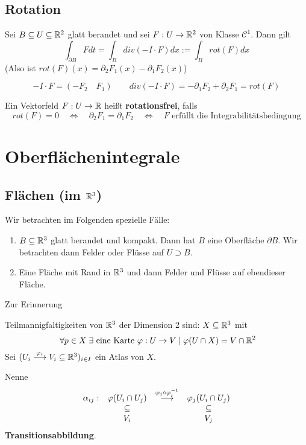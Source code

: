 \documentclass[main.tex]{subfiles}
\begin{document}
\subsection{Rotation}

\begin{Theorem}
  Sei $B \subseteq U \subseteq \mathbb{R}^2$ glatt berandet und sei $F : U \to \mathbb{R}^2$ von Klasse $\mathcal{C}^1$. Dann gilt
  $$\int_{\partial B} F dt = \int_B div(-I\cdot F)dx := \int_B rot(F) dx$$
  (Also ist $rot(F)(x) = \partial_2 F_1(x) - \partial_1 F_2(x)$)
\end{Theorem}

\begin{Beweis}
  $$-I \cdot F = (-F_2 \quad F_1) \qquad div(-I \cdot F) = -\partial_1 F_2 + \partial_2 F_1 = rot(F)$$
\end{Beweis}

\begin{Definition}
  Ein Vektorfeld $F: U \to \mathbb{R}$ heißt \textbf{rotationsfrei}, falls
  $$rot(F) = 0 \quad \Leftrightarrow \quad \partial_2 F_1 = \partial_1 F_2 \quad \Leftrightarrow \quad F \text{ erfüllt die Integrabilitätsbedingung}$$
\end{Definition}


\section{Oberflächenintegrale}

\subsection{Flächen (im $\mathbb{R}^3$)}

Wir betrachten im Folgenden spezielle Fälle:
\begin{enumerate}
  \item $B \subseteq \mathbb{R}^3$ glatt berandet und kompakt. Dann hat $B$ eine Oberfläche $\partial B$. Wir betrachten dann Felder oder Flüsse auf $U \supset B$.
  \item Eine Fläche mit Rand in $\mathbb{R}^3$ und dann Felder und Flüsse auf ebendieser Fläche.
\end{enumerate}

Zur Erinnerung
\begin{Definition}[Teilmannigfaltigkeit]
  Teilmannigfaltigkeiten von $\mathbb{R}^3$ der Dimension 2 sind: $X \subseteq \mathbb{R}^3$ mit
  $$\;\forall p \in X \;\exists \text{ eine Karte } \varphi: U \to V \mid \varphi(U \cap X) = V \cap \mathbb{R}^2$$
  Sei $(U_i \stackrel{\varphi_i}{\longrightarrow} V_i \subseteq \mathbb{R}^3)_{i \in I}$ ein Atlas von $X$.

  Nenne
  $$\begin{array}{c c c c}
    \alpha_{ij}: & \varphi(U_i \cap U_j) & \stackrel{\varphi_j \circ \varphi_i^{-1}}{\longrightarrow} & \varphi_j(U_i \cap U_j) \\
    & \subseteq & & \subseteq \\
    & V_i & & V_j
  \end{array}$$
  \textbf{Transitionsabbildung}.
\end{Definition}
\end{document}
